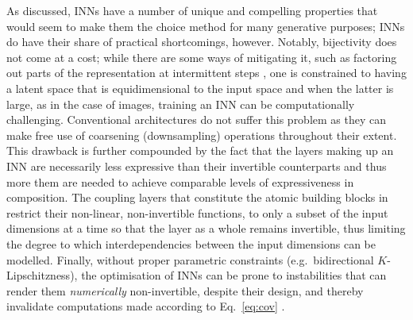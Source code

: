 %
As discussed, \acp{INN} have a number of unique and compelling properties that would seem to make them
the choice method for many generative purposes; \acp{INN} do have their share of practical
shortcomings, however. 
%
Notably, bijectivity does not come at a cost; while there are some ways of mitigating it, such as
factoring out parts of the representation at intermittent steps \citep{hoogeboom2019integer}, one
is constrained to having a latent space that is equidimensional to the input space and when the
latter is large, as in the case of images, training an \ac{INN} can be computationally challenging.
%
Conventional architectures do not suffer this problem as they can make free use of coarsening
(downsampling) operations throughout their extent.
%
This drawback is further compounded by the fact that the layers making up an \ac{INN} are necessarily
less expressive than their invertible counterparts and thus more them are needed to achieve
comparable levels of expressiveness in composition. 
%
The coupling layers that constitute the atomic building blocks in \citet{dinh2014nice} restrict
their non-linear, non-invertible functions, to only a subset of the input dimensions at a time so
that the layer as a whole remains invertible, thus limiting the degree to which interdependencies
between the input dimensions can be modelled.
%
Finally, without proper parametric constraints (e.g.\ bidirectional \(K\)-Lipschitzness), the
optimisation of \acp{INN} can be prone to instabilities that can render them \emph{numerically}
non-invertible, despite their design, and thereby invalidate computations made according to
Eq.~\ref{eq:cov} \citep{behrmann2021understanding}.
